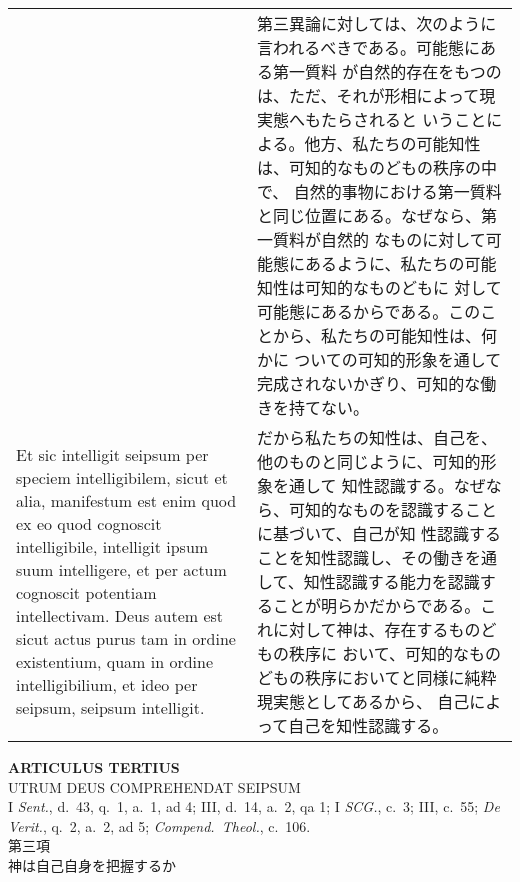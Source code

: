 \documentclass[10pt]{jsarticle} %
\begin{document}
\begin{longtable}{p{21em}p{21em}}
&

第三異論に対しては、次のように言われるべきである。可能態にある第一質料
が自然的存在をもつのは、ただ、それが形相によって現実態へもたらされると
いうことによる。他方、私たちの可能知性は、可知的なものどもの秩序の中で、
自然的事物における第一質料と同じ位置にある。なぜなら、第一質料が自然的
なものに対して可能態にあるように、私たちの可能知性は可知的なものどもに
対して可能態にあるからである。このことから、私たちの可能知性は、何かに
ついての可知的形象を通して完成されないかぎり、可知的な働きを持てない。


\\

Et sic intelligit seipsum per speciem intelligibilem, sicut et alia,
manifestum est enim quod ex eo quod cognoscit intelligibile,
intelligit ipsum suum intelligere, et per actum cognoscit potentiam
intellectivam. Deus autem est sicut actus purus tam in ordine
existentium, quam in ordine intelligibilium, et ideo per seipsum,
seipsum intelligit.


&

だから私たちの知性は、自己を、他のものと同じように、可知的形象を通して
知性認識する。なぜなら、可知的なものを認識することに基づいて、自己が知
性認識することを知性認識し、その働きを通して、知性認識する能力を認識す
ることが明らかだからである。これに対して神は、存在するものどもの秩序に
おいて、可知的なものどもの秩序においてと同様に純粋現実態としてあるから、
自己によって自己を知性認識する。



\end{longtable}
\newpage

\begin{center}
{\Large {\bf ARTICULUS TERTIUS}}\\ {\large UTRUM DEUS COMPREHENDAT
SEIPSUM}\\ {\footnotesize I {\itshape Sent.}, d.~43, q.~1, a.~1, ad 4;
III, d.~14, a.~2, qa 1; I {\itshape SCG.}, c.~3; III, c.~55; {\itshape
De Verit.}, q.~2, a.~2, ad 5; {\itshape Compend.~Theol.}, c.~106.}\\
{\Large 第三項\\神は自己自身を把握するか}
\end{center}
\end{document}
